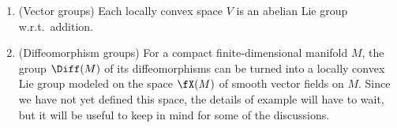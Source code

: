 \begin{example}
    \begin{enumerate}[label=(\alph*)]
        \item (Vector groups) Each locally convex space $V$ is an abelian Lie group w.r.t.\ addition.
        \item (Diffeomorphism groups) For a compact finite-dimensional manifold $M$, the group $\Diff(M)$ of its diffeomorphisms can be turned into a locally convex Lie group modeled on the space $\fX(M)$ of smooth vector fields on $M$. Since we have not yet defined this space, the details of example will have to wait, but it will be useful to keep in mind for some of the discussions.
    \end{enumerate}
\end{example}

